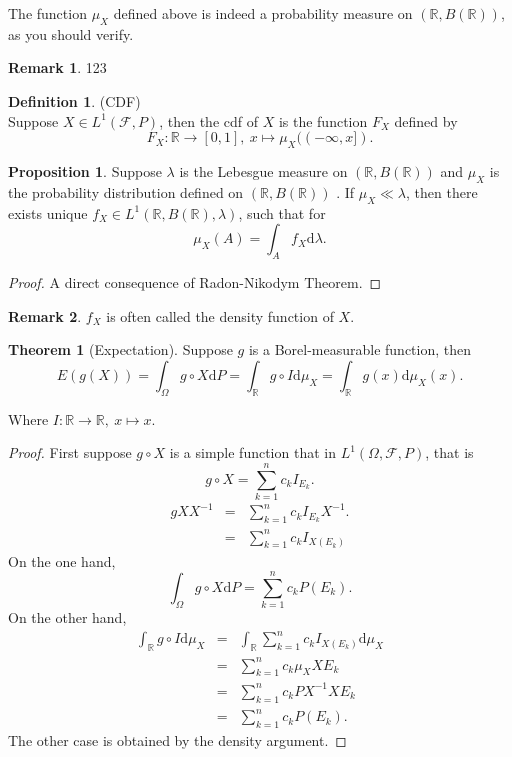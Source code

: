 \documentclass[12pt]{book}
\theoremstyle{definition}
\newtheorem{definition}{Definition}[chapter]
\newtheorem{theorem}{Theorem}[chapter]
\newtheorem{proposition}{Proposition}[section]
\newtheorem{remark}{Remark}
\newcommand{\R}{\mathbb{R}}
\newcommand{\D}{\mathrm{d}}
\newcommand{\Sum}[2]{{\sum_{#1}^{#2}}}
\begin{document}
The function $\mu_X$ defined above is indeed a probability measure on $(\R,B(\R))$, as you should verify.
\begin{remark}
	123
\end{remark}
\begin{definition}(CDF) \\
Suppose $X \in L^1(\mathcal F,P)$, then the cdf of $X$ is the function $F_X$ defined by
$$
F_X:\R \to [0,1], \ x \mapsto \mu_X((-\infty,x]).
$$
\end{definition}
\begin{proposition}
Suppose $\lambda$ is the Lebesgue measure on $(\R,B(\R))$ and $\mu_X$ is the probability distribution defined on $(\R,B(\R))$	. If $\mu_X \ll \lambda$, then 
there exists unique $f_X\in L^1(\R,B(\R),\lambda)$, such that for
$$
\mu_X(A) = \int_A f_X \D \lambda.
$$
\end{proposition}
\begin{proof}
A direct consequence of Radon-Nikodym Theorem. 	
\end{proof}
\begin{remark}
$f_X$ is often called the density function of $X$.
\end{remark}

\begin{theorem}[Expectation] Suppose $g$ is a Borel-measurable function, then
$$
E(g(X))=\int_\Omega g\circ X \D P = \int_\R g\circ I \D \mu_X = \int_\R g(x) \D \mu_X(x).
$$
\end{theorem}
Where $I: \R \to \R, \ x \mapsto x$.
\begin{proof}
First suppose $g \circ X$ is a simple function that in $L^1(\Omega,\mathcal F,P)$, that is 
$$
g \circ X = \Sum{k=1}{n} c_k I_{E_k}.
$$	
\begin{eqnarray*}
	g X X^{-1} &=& \Sum{k=1}{n} c_k I_{E_k}X^{-1}. \\
	&=& \Sum{k=1}{n} c_k I_{X(E_k)}
\end{eqnarray*}
On the one hand, 
$$
\int_\Omega g\circ X \D P = \Sum{k=1}{n} c_k P(E_k).
$$
On the other hand, 
\begin{eqnarray*}
\int_\R g\circ I \D \mu_X &=& \int_\R \Sum{k=1}{n} c_k I_{X(E_k)} \D \mu_X \\
&=& \Sum{k=1}{n} c_k \mu_X XE_k \\
&=& \Sum{k=1}{n} c_k P X^{-1} X E_k \\
&=& \Sum{k=1}{n} c_k P(E_k).
\end{eqnarray*}
The other case is obtained by the density argument.
\end{proof}
\end{document}
